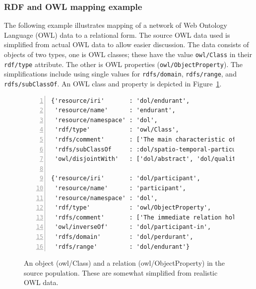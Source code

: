 \documentclass[10pt,letterpaper]{article} %
\newcommand{\stt}[1]{\texttt{#1}} %
\begin{document}

\subsubsection{RDF and OWL mapping example}

The following example illustrates mapping of a network of Web Ontology Language (OWL) data to a relational form.
The source OWL data used is simplified from actual OWL data to allow easier discussion.
The data consists of objects of two types, one is OWL classes; these have the value  \stt{owl/Class} in their \stt{rdf/type} attribute.
The other is OWL properties (\stt{owl/ObjectProperty}).
The simplifications include using single values for \stt{rdfs/domain}, \stt{rdfs/range}, and \stt{rdfs/subClassOf}.
An OWL class and property is depicted in Figure~\ref{code:endurant}.

\begin{figure}[H]
  \caption{An object (owl/Class) and a relation (owl/ObjectProperty) in the source population.
    These are somewhat simplified from realistic OWL data.}
  \label{code:endurant}
\begin{lstlisting}[numberstyle=\scriptsize,basicstyle=\ttfamily\scriptsize,numbers=left,stepnumber=1,breaklines=true]
{'resource/iri'       : 'dol/endurant',
 'resource/name'      : 'endurant',
 'resource/namespace' : 'dol',
 'rdf/type'           : 'owl/Class',
 'rdfs/comment'       : ['The main characteristic of endurants is...'],
 'rdfs/subClassOf     : :dol/spatio-temporal-particular,
 'owl/disjointWith'   : ['dol/abstract', 'dol/quality', 'dol/perdurant']}

{'resource/iri'       : 'dol/participant',
 'resource/name'      : 'participant',
 'resource/namespace' : 'dol',
 'rdf/type'           : 'owl/ObjectProperty',
 'rdfs/comment'       : ['The immediate relation holding between endurants and perdurants...'],
 'owl/inverseOf'      : 'dol/participant-in',
 'rdfs/domain'        : 'dol/perdurant',
 'rdfs/range'         : 'dol/endurant'}
\end{lstlisting}
\end{figure}
\end{document}
